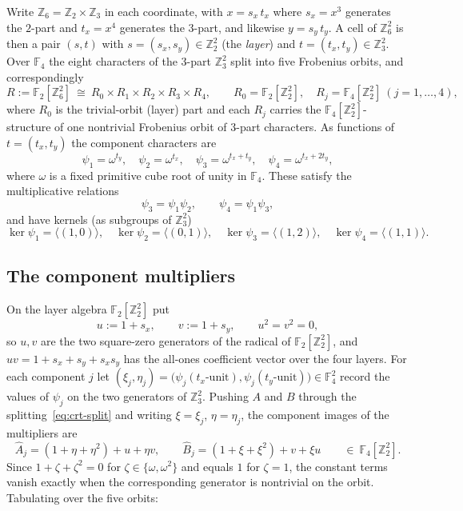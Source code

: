 \documentclass[11pt]{article}
\newcommand{\Z}{\mathbb{Z}}
\newcommand{\F}[1]{\mathbb{F}_{#1}}
\newcommand{\hA}{\hat{A}}
\newcommand{\hB}{\hat{B}}
\newcommand{\sx}{s_x}
\newcommand{\sy}{s_y}
\newcommand{\tx}{t_x}
\newcommand{\ty}{t_y}
\theoremstyle{plain}
\theoremstyle{definition}
\theoremstyle{remark}
\begin{document}
Write $\Z_6=\Z_2\times\Z_3$ in each coordinate, with $x=\sx\,\tx$ where
$\sx=x^3$ generates the $2$-part and $\tx=x^4$ generates the $3$-part, and
likewise $y=\sy\,\ty$. A cell of $\Z_6^2$ is then a pair $(s,t)$ with
$s=(\sx,\sy)\in\Z_2^2$ (the \emph{layer}) and $t=(\tx,\ty)\in\Z_3^2$. Over
$\F4$ the eight characters of the $3$-part $\Z_3^2$ split into five Frobenius
orbits, and correspondingly
\begin{equation}\label{eq:crt-split}
  R:=\F2[\Z_6^2]\ \cong\ R_0\times R_1\times R_2\times R_3\times R_4,
  \qquad R_0=\F2[\Z_2^2],\quad R_j=\F4[\Z_2^2]\ (j=1,\dots,4),
\end{equation}
where $R_0$ is the trivial-orbit (layer) part and each $R_j$ carries the
$\F4[\Z_2^2]$-structure of one nontrivial Frobenius orbit of $3$-part
characters. As functions of $t=(\tx,\ty)$ the component characters are
\[
  \psi_1=\omega^{\ty},\quad
  \psi_2=\omega^{\tx},\quad
  \psi_3=\omega^{\tx+\ty},\quad
  \psi_4=\omega^{\tx+2\ty},
\]
where $\omega$ is a fixed primitive cube root of unity in $\F4$. These satisfy
the multiplicative relations
\[
  \psi_3=\psi_1\psi_2,\qquad \psi_4=\psi_1\psi_3,
\]
and have kernels (as subgroups of $\Z_3^2$)
\[
  \ker\psi_1=\langle(1,0)\rangle,\quad
  \ker\psi_2=\langle(0,1)\rangle,\quad
  \ker\psi_3=\langle(1,2)\rangle,\quad
  \ker\psi_4=\langle(1,1)\rangle.
\]

\subsection{The component multipliers}

On the layer algebra $\F2[\Z_2^2]$ put
\[
  u:=1+\sx,\qquad v:=1+\sy,\qquad u^2=v^2=0,
\]
so $u,v$ are the two square-zero generators of the radical of $\F2[\Z_2^2]$,
and $uv=1+\sx+\sy+\sx\sy$ has the all-ones coefficient vector over the four
layers. For each component $j$ let
$(\xi_j,\eta_j)=\bigl(\psi_j(\tx\text{-unit}),\psi_j(\ty\text{-unit})\bigr)\in\F4^2$
record the values of $\psi_j$ on the two generators of $\Z_3^2$. Pushing $A$ and
$B$ through the splitting~\eqref{eq:crt-split} and writing $\xi=\xi_j$,
$\eta=\eta_j$, the component images of the multipliers are
\begin{equation}\label{eq:crt-mult}
  \hA_j=(1+\eta+\eta^2)+u+\eta v,\qquad
  \hB_j=(1+\xi+\xi^2)+v+\xi u\qquad\in\ \F4[\Z_2^2].
\end{equation}
Since $1+\zeta+\zeta^2=0$ for $\zeta\in\{\omega,\omega^2\}$ and equals $1$ for
$\zeta=1$, the constant terms vanish exactly when the corresponding generator is
nontrivial on the orbit. Tabulating over the five orbits:
\end{document}
